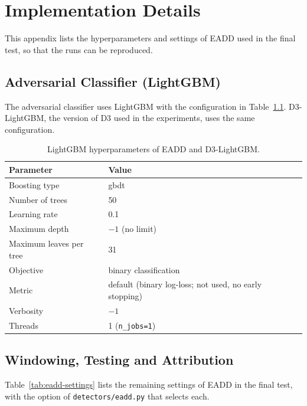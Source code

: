 \chapter{Implementation Details} \label{app:implementation}

This appendix lists the hyperparameters and settings of EADD used in the final test, so that the runs can be reproduced.

\section{Adversarial Classifier (LightGBM)}
The adversarial classifier uses LightGBM \citep{Ke2017} with the configuration in Table~\ref{tab:lgbm-params}. D3-LightGBM, the version of D3 used in the experiments, uses the same configuration.

\begin{table}[!htbp]
\centering
\caption{LightGBM hyperparameters of EADD and D3-LightGBM.}\label{tab:lgbm-params}
\small
\begin{tabular}{ll}
\toprule
Parameter & Value \\
\midrule
Boosting type & gbdt \\
Number of trees & 50 \\
Learning rate & 0.1 \\
Maximum depth & $-1$ (no limit) \\
Maximum leaves per tree & 31 \\
Objective & binary classification \\
Metric & default (binary log-loss; not used, no early stopping) \\
Verbosity & $-1$ \\
Threads & 1 (\texttt{n\_jobs=1}) \\
\bottomrule
\end{tabular}
\end{table}

\section{Windowing, Testing and Attribution}
Table~\ref{tab:eadd-settings} lists the remaining settings of EADD in the final test, with the option of \nolinkurl{detectors/eadd.py} that selects each.

